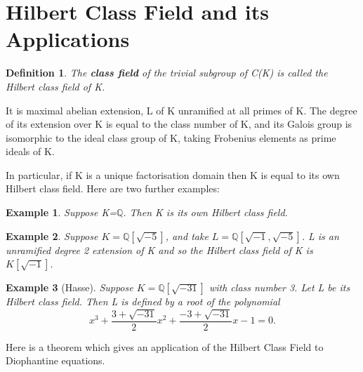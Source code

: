 \documentclass[preprint,12pt,reqno]{elsarticle}
\newtheorem{definition}{Definition}
\newtheorem{example}{Example}
\begin{document}
\section{Hilbert Class Field and its Applications}
\begin{definition}
The \textbf{class field} of the trivial subgroup of C(K) is called the Hilbert class field of K. 
\end{definition}
It is maximal abelian extension, L of K unramified at all primes of K. The degree of its extension over K is equal to the class number of K, and its Galois group is isomorphic to the ideal class group of K, taking Frobenius elements as prime ideals of K.\par
In particular, if K is a unique factorisation domain then K is equal to its own Hilbert class field. 
Here are two further examples:
\begin{example}
    Suppose K=$\mathbb{Q}$. Then K is its own Hilbert class field. 
\end{example}
\begin{example}
    Suppose $K=\mathbb{Q}[\sqrt{-5}]$, and take $L=\mathbb{Q}[\sqrt{-1},\sqrt{-5}]$. L is an unramified degree 2 extension of K and so the Hilbert class field of K is $K[\sqrt{-1}]$.
\end{example}
\begin{example}[Hasse]
    Suppose $K=\mathbb{Q}[\sqrt{-31}]$ with class number 3. Let L be its Hilbert class field. Then L is defined by a root of the polynomial \begin{equation}
        x^3+\frac{3+\sqrt{-31}}{2}x^2+\frac{-3+\sqrt{-31}}{2}x -1 =0.
    \end{equation}
\end{example}
Here is a theorem which gives an application of the Hilbert Class Field to Diophantine equations.
\end{document}
